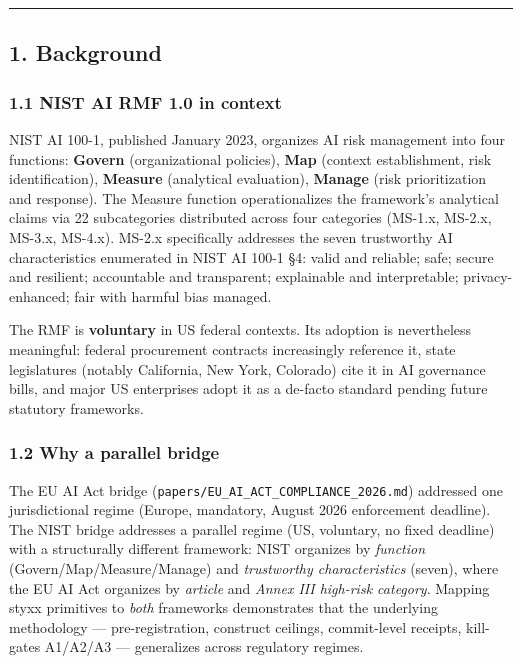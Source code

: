 \documentclass[
]{article}
\begin{document}
\begin{center}\rule{0.5\linewidth}{0.5pt}\end{center}

\subsection{1. Background}\label{background}

\subsubsection{1.1 NIST AI RMF 1.0 in
context}\label{nist-ai-rmf-1.0-in-context}

NIST AI 100-1, published January 2023, organizes AI risk management into
four functions: \textbf{Govern} (organizational policies), \textbf{Map}
(context establishment, risk identification), \textbf{Measure}
(analytical evaluation), \textbf{Manage} (risk prioritization and
response). The Measure function operationalizes the framework's
analytical claims via 22 subcategories distributed across four
categories (MS-1.x, MS-2.x, MS-3.x, MS-4.x). MS-2.x specifically
addresses the seven trustworthy AI characteristics enumerated in NIST AI
100-1 §4: valid and reliable; safe; secure and resilient; accountable
and transparent; explainable and interpretable; privacy-enhanced; fair
with harmful bias managed.

The RMF is \textbf{voluntary} in US federal contexts. Its adoption is
nevertheless meaningful: federal procurement contracts increasingly
reference it, state legislatures (notably California, New York,
Colorado) cite it in AI governance bills, and major US enterprises adopt
it as a de-facto standard pending future statutory frameworks.

\subsubsection{1.2 Why a parallel bridge}\label{why-a-parallel-bridge}

The EU AI Act bridge (\texttt{papers/EU\_AI\_ACT\_COMPLIANCE\_2026.md})
addressed one jurisdictional regime (Europe, mandatory, August 2026
enforcement deadline). The NIST bridge addresses a parallel regime (US,
voluntary, no fixed deadline) with a structurally different framework:
NIST organizes by \emph{function} (Govern/Map/Measure/Manage) and
\emph{trustworthy characteristics} (seven), where the EU AI Act
organizes by \emph{article} and \emph{Annex III high-risk category}.
Mapping styxx primitives to \emph{both} frameworks demonstrates that the
underlying methodology --- pre-registration, construct ceilings,
commit-level receipts, kill-gates A1/A2/A3 --- generalizes across
regulatory regimes.
\end{document}
